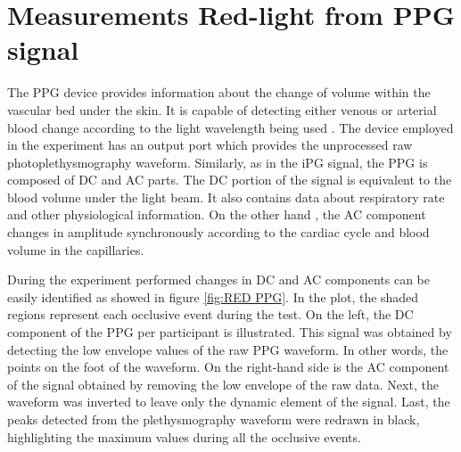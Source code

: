 \section{Measurements Red-light from PPG signal}
\label{section comparison 3}
The PPG device provides information about the change of volume within the vascular bed under the skin. It is capable of detecting either venous or arterial blood change according to the light wavelength being used . The device employed in the experiment has an output port which provides the unprocessed raw photoplethysmography waveform. Similarly, as in the iPG signal, the PPG is composed of DC and AC parts. The DC portion of the signal is equivalent to the blood volume under the light beam. It also contains data about respiratory rate and other physiological information. On the other hand , the AC component changes in amplitude synchronously according to the cardiac cycle and blood volume in the capillaries. 

During the experiment performed changes in DC and AC components can be easily identified  as showed in figure \ref{fig:RED PPG}. In the plot, the shaded regions represent each occlusive event during the test. On the left, the DC component of the PPG per participant is illustrated. This signal was obtained by detecting the low envelope values of the raw PPG waveform. In other words, the points on the foot of the waveform.  On the right-hand side is the AC component of the signal obtained by removing the low envelope of the raw data. Next, the waveform was inverted to leave only the dynamic element of the signal. Last, the peaks detected from the plethysmography waveform were redrawn in black, highlighting the maximum values during all the occlusive events.  

